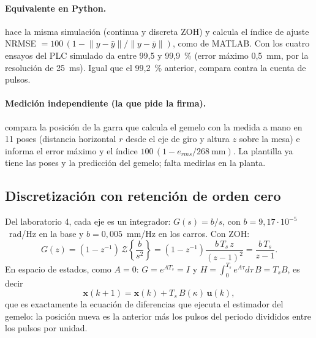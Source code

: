 \documentclass[a4paper,11pt]{article}
\begin{document}
\paragraph{Equivalente en Python.}  hace la misma simulación (continua y discreta ZOH) y calcula el índice de ajuste NRMSE $= 100\,(1 - \lVert y - \hat y\rVert / \lVert y - \bar y\rVert)$, como  de MATLAB. Con los cuatro ensayos del PLC simulado da entre 99,5 y 99,9~\% (error máximo 0,5~mm, por la resolución de 25~ms). Igual que el 99,2~\% anterior, compara contra la cuenta de pulsos.

\paragraph{Medición independiente (la que pide la firma).}  compara la posición de la garra que calcula el gemelo con la medida a mano en 11 poses (distancia horizontal $r$ desde el eje de giro y altura $z$ sobre la mesa) e informa el error máximo y el índice $100\,(1 - e_{rms}/268~\text{mm})$. La plantilla ya tiene las poses y la predicción del gemelo; falta medirlas en la planta.

\subsection{Discretización con retención de orden cero}
Del laboratorio 4, cada eje es un integrador: $G(s) = b/s$, con $b = 9{,}17\cdot10^{-5}$~rad/Hz en la base y $b = 0{,}005$~mm/Hz en los carros. Con ZOH:
\[
G(z) = (1 - z^{-1})\,\mathcal{Z}\left\{\frac{b}{s^2}\right\} = (1 - z^{-1})\frac{b\,T_s\,z}{(z-1)^2} = \frac{b\,T_s}{z - 1}.
\]
En espacio de estados, como $A = 0$: $G = e^{AT_s} = I$ y $H = \int_0^{T_s} e^{A\tau}d\tau\,B = T_s B$, es decir
\[
\mathbf{x}(k+1) = \mathbf{x}(k) + T_s\,B(\kappa)\,\mathbf{u}(k),
\]
que es exactamente la ecuación de diferencias que ejecuta el estimador del gemelo: la posición nueva es la anterior más los pulsos del periodo divididos entre los pulsos por unidad.
\end{document}

